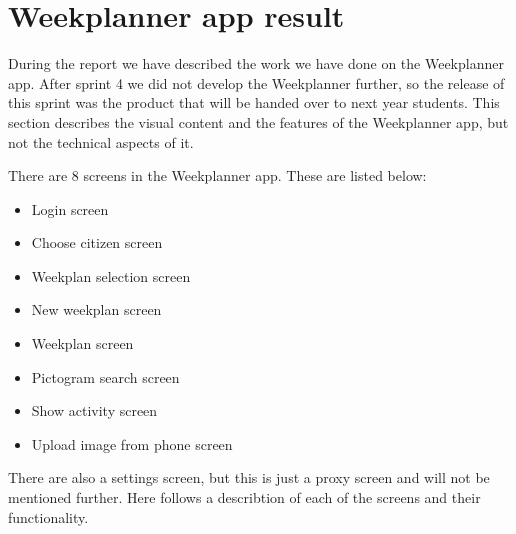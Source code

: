 \section{Weekplanner app result}
During the report we have described the work we have done on the Weekplanner app. After sprint 4 we did not develop the Weekplanner further, so the release of this sprint was the product that will be handed over to next year students. This section describes the visual content and the features of the Weekplanner app, but not the technical aspects of it. 

There are 8 screens in the Weekplanner app. These are listed below:
\begin{itemize}
    \item Login screen 
    \item Choose citizen screen
    \item Weekplan selection screen 
    \item New weekplan screen 
    \item Weekplan screen 
    \item Pictogram search screen 
    \item Show activity screen 
    \item Upload image from phone screen 
\end{itemize}

There are also a settings screen, but this is just a proxy screen and will not be mentioned further. Here follows a describtion of each of the screens and their functionality. 

